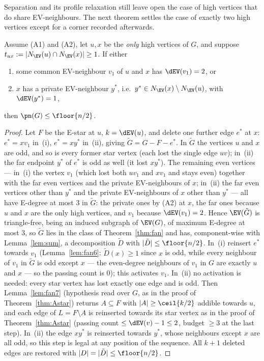 Separation and its profile relaxation still leave open the case of high vertices that do share
EV-neighbours. The next theorem settles the case of exactly two high vertices except for a
corner recorded afterwards.

\begin{theorem}\label{thm:twohigh}
Assume {\rm(A1)} and {\rm(A2)}, let $u,x$ be the \emph{only} high vertices of $G$, and suppose
$t_{ux}:=|N_{\EV}(u)\cap N_{\EV}(x)|\ge1$. If either
\begin{enumerate}[label={\rm(\roman*)},leftmargin=2em]
\item some common EV-neighbour $v_1$ of $u$ and $x$ has $\dEV(v_1)=2$, or
\item $x$ has a private EV-neighbour $y^*$, i.e.\ $y^*\in N_{\EV}(x)\setminus N_{\EV}(u)$,
with $\dEV(y^*)=1$,
\end{enumerate}
then $\pn(G)\le\floor{n/2}$.
\end{theorem}

\begin{proof}
Let $F$ be the E-star at $u$, $k=\dEV(u)$, and delete one further edge $e^*$ at $x$:
$e^*=xv_1$ in~(i), $e^*=xy^*$ in~(ii), giving $\tilde G=G-F-e^*$.
In $\tilde G$ the vertices $u$ and $x$ are odd, and so is every former star vertex (each
lost the single edge $uv$); in~(ii) the far endpoint $y^*$ of $e^*$ is odd as well (it lost
$xy^*$). The remaining even vertices --- in~(i) the vertex $v_1$ (which lost both $uv_1$
and $xv_1$ and stays even) together with the far even vertices and the private
EV-neighbours of $x$; in~(ii) the far even vertices other than $y^*$ and the private
EV-neighbours of $x$ other than $y^*$ --- all have E-degree at most $3$ in $\tilde G$: the
private ones by
{\rm(A2)} at $x$, the far ones because $u$ and $x$ are the only high vertices, and $v_1$
because $\dEV(v_1)=2$. Hence $\EV(\tilde G)$ is triangle-free, being an induced subgraph of
$\EV(G)$, of maximum E-degree at most $3$, so $\tilde G$ lies in the class of
Theorem~\ref{thm:fan} and has, component-wise with Lemma~\ref{lem:sum}, a decomposition
$\tilde D$ with $|\tilde D|\le\floor{n/2}$. In~(i) reinsert $e^*$ towards $v_1$
(Lemma~\ref{lem:fan6}: $\tilde D(x)\ge1$ since $x$ is odd, while every neighbour of $v_1$ in
$\tilde G$ is odd except $x$ --- the even-degree neighbours of $v_1$ in $G$ are exactly $u$ and
$x$ --- so the passing count is $0$); this activates $v_1$. In~(ii) no activation is needed:
every star vertex has lost exactly one edge and is odd. Then Lemma~\ref{lem:fan7} (hypothesis
read over $G$, as in the proof of Theorem~\ref{thm:Astar}) returns $A\subseteq F$ with
$|A|\ge\ceil{k/2}$ addible towards $u$, and each edge of $L=F\setminus A$ is reinserted towards
its star vertex as in the proof of Theorem~\ref{thm:Astar} (passing count $\le\dEV(v)-1\le2$,
budget $\ge3$ at the last step). In~(ii) the edge $xy^*$ is reinserted towards $y^*$, whose
neighbours except $x$ are all odd, so this step is legal at any position of the sequence. All
$k+1$ deleted edges are restored with $|D|=|\tilde D|\le\floor{n/2}$.
\end{proof}

